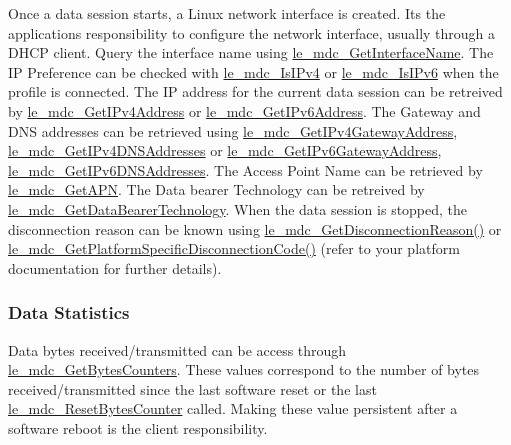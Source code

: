 Once a data session starts, a Linux network interface is created. It\textquotesingle{}s the application\textquotesingle{}s responsibility to configure the network interface, usually through a D\+H\+C\+P client. Query the interface name using \hyperlink{le__mdc__interface_8h_abf470aa8e252114cbb95b4e337083d52}{le\+\_\+mdc\+\_\+\+Get\+Interface\+Name}. The I\+P Preference can be checked with \hyperlink{le__mdc__interface_8h_aa3912e94864a6e5862e07f58b3772cba}{le\+\_\+mdc\+\_\+\+Is\+I\+Pv4} or \hyperlink{le__mdc__interface_8h_adde11de0b17b2c937acca6355b6fba11}{le\+\_\+mdc\+\_\+\+Is\+I\+Pv6} when the profile is connected. The I\+P address for the current data session can be retreived by \hyperlink{le__mdc__interface_8h_a732acb5823549a1644aa1bb5ba69fea5}{le\+\_\+mdc\+\_\+\+Get\+I\+Pv4\+Address} or \hyperlink{le__mdc__interface_8h_aacd6a0b646f26625cdb26a78d42f8e5f}{le\+\_\+mdc\+\_\+\+Get\+I\+Pv6\+Address}. The Gateway and D\+N\+S addresses can be retrieved using \hyperlink{le__mdc__interface_8h_af4be1afa6d44a4a7041f9f02660704b9}{le\+\_\+mdc\+\_\+\+Get\+I\+Pv4\+Gateway\+Address}, \hyperlink{le__mdc__interface_8h_ae99f6e212de1b0c0ea8a8763b62e0bea}{le\+\_\+mdc\+\_\+\+Get\+I\+Pv4\+D\+N\+S\+Addresses} or \hyperlink{le__mdc__interface_8h_a0b82eac1ed112bd3b82060cc54751246}{le\+\_\+mdc\+\_\+\+Get\+I\+Pv6\+Gateway\+Address}, \hyperlink{le__mdc__interface_8h_a8aeb3f684567eee2976b851b7d713f01}{le\+\_\+mdc\+\_\+\+Get\+I\+Pv6\+D\+N\+S\+Addresses}. The Access Point Name can be retrieved by \hyperlink{le__mdc__interface_8h_ac9accd1ea303d6840e5e7de19b0dae6f}{le\+\_\+mdc\+\_\+\+Get\+A\+P\+N}. The Data bearer Technology can be retreived by \hyperlink{le__mdc__interface_8h_a1b17bb87b347162013b5ad608cdcda2d}{le\+\_\+mdc\+\_\+\+Get\+Data\+Bearer\+Technology}. When the data session is stopped, the disconnection reason can be known using \hyperlink{le__mdc__interface_8h_afe73f44c23b1bd120dd82a85b36c6059}{le\+\_\+mdc\+\_\+\+Get\+Disconnection\+Reason()} or \hyperlink{le__mdc__interface_8h_a3e3a92b0f5e3edab9400412170517a62}{le\+\_\+mdc\+\_\+\+Get\+Platform\+Specific\+Disconnection\+Code()} (refer to your platform documentation for further details).\hypertarget{c_mdc_le_mdc_dataStatistics}{}\subsubsection{Data Statistics}\label{c_mdc_le_mdc_dataStatistics}
Data bytes received/transmitted can be access through \hyperlink{le__mdc__interface_8h_aaad833c105f7d0ae77f18195d6739080}{le\+\_\+mdc\+\_\+\+Get\+Bytes\+Counters}. These values correspond to the number of bytes received/transmitted since the last software reset or the last \hyperlink{le__mdc__interface_8h_a63636b2779d2ee6a6520ebfb2d26666c}{le\+\_\+mdc\+\_\+\+Reset\+Bytes\+Counter} called. Making these value persistent after a software reboot is the client responsibility.





